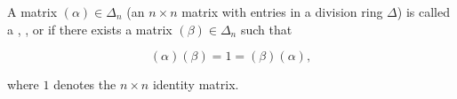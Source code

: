 A matrix $(\alpha) \in \Delta_n$ (an $n \times n$ matrix with entries in a division ring $\Delta$) is called a , , or  if there exists a matrix $(\beta) \in \Delta_n$ such that

$$(\alpha)(\beta) = 1 = (\beta)(\alpha),$$

where $1$ denotes the $n \times n$ identity matrix.
